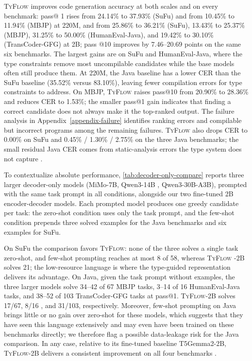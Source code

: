 \documentclass[manuscript,screen]{acmart}
\newcommand{\toolname}[1]{\textsc{#1}}
\newcommand{\mainname}{\toolname{TyFlow}\xspace}
\begin{document}
\mainname   improves code generation accuracy  %
  {\color{revblue}at both scales and on every benchmark: } pass@   {\color{revblue}1 rises from 24.14\% } to  %
  {\color{revblue}37.93\% (SuFu) and from 10.45\% to 11.94\% (MBJP) at 220M, and from 25.86\% } to  {\color{revblue}36.21\% (SuFu), 13.43\% to 25.37\% (MBJP), 31.25\% to } 50.00\%  %
  {\color{revblue}(HumanEval-Java), and 19.42\% to 30.10\% (TransCoder-GFG) at 2B; pass} @10    {\color{revblue}improves by 7.46--20.69 points on the same six benchmarks.
The largest gains are on SuFu } and  %
  {\color{revblue}HumanEval-Java, where the type constraints remove most uncompilable candidates while the base models often still produce them.
At 220M, the Java baseline has a lower CER than the SuFu baseline (35.52\% versus 83.10\%), leaving fewer compilation errors for type constraints to address. On MBJP, }\mainname{} {\color{revblue}raises pass@10 from 20.90\% to 28.36\% and reduces CER to 1.53\%; the smaller pass@1 gain indicates that finding a correct candidate does not always make it the top-ranked output. The failure analysis in Appendix~\ref{appendix-failure} identifies ranking errors and compilable but incorrect programs among the remaining failures.
}\mainname{} {\color{revblue}also drops CER to 0.00\% on SuFu and 0.45\% / 1.30\% / 2.75\% on the three Java benchmarks; the small residual Java CER comes from static-analysis errors the type system does not capture} .
   

{\color{revblue}To contextualize absolute performance, }\autoref{tab:decoder-only-compare} {\color{revblue}reports three larger decoder-only models (MiMo-7B, Qwen3-14B} ,  %
  {\color{revblue}Qwen3-30B-A3B), prompted with the same task prompt in all conditions, alongside our two fine-tuned 2B encoder-decoder models.
Each prompted model produces one greedy candidate per task: the zero-shot condition uses only the task prompt, and the few-shot condition prepends three solved examples for the Java benchmarks and six examples for SuFu.
} 

   {\color{revblue}On SuFu the comparison favors }\mainname{}{\color{revblue}: none of the three solves a single task zero-shot, and few-shot prompting reaches at most 8 of 58, whereas } \mainname %
  {\color{revblue}-2B solves 21; the low-resource language is where the type-guided representation delivers its advantage.
} On Java,  {\color{revblue}given the task prompt without examples, the three larger models solve 34--42 of 67 MBJP tasks, 3--14 of 16 HumanEval-Java tasks, and 38--52 of 103 TransCoder-GFG tasks at pass@1. } \mainname   {\color{revblue}-2B solves 17/67, 8/16} , and  {\color{revblue}31/103, respectively. Moreover, few-shot prompting on Java brings little or no gain over zero-shot for these models, which suggests that they have seen this language extensively and may even have been trained on these benchmarks directly; we therefore flag a possible data-leakage risk for the Java comparison.
In any case, relative to its fine-tuned baseline T5Gemma2-2B, } \mainname-2B    {\color{revblue}delivers a consistent improvement on all four benchmarks} .
\end{document}
